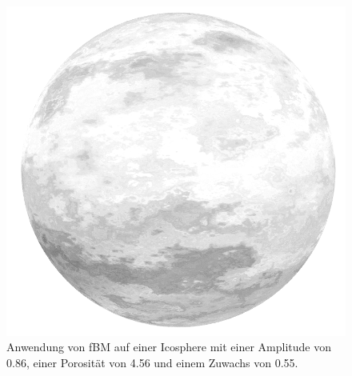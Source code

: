 \begin{figure}
  \includegraphics[width=0.6\columnwidth]{fbm-sphere}
  \caption{Anwendung von fBM auf einer Icosphere mit einer Amplitude von 0.86, einer Porosität von 4.56 und einem Zuwachs von 0.55.}
\end{figure}